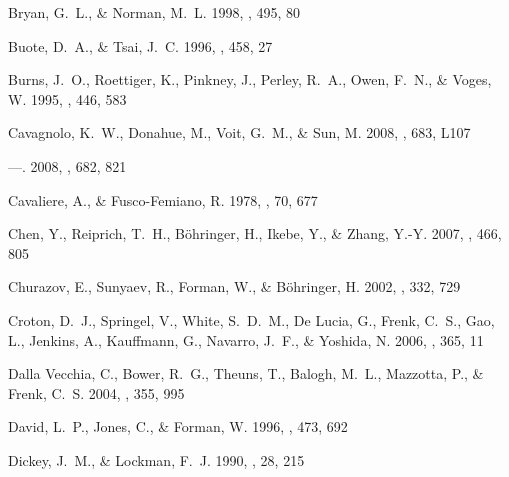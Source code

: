 \documentclass[12pt,preprint]{aastex}
\begin{document}
\begin{thebibliography}{138}
{Bryan}, G.~L., \& {Norman}, M.~L. 1998, \apj, 495, 80

{Buote}, D.~A., \& {Tsai}, J.~C. 1996, \apj, 458, 27

{Burns}, J.~O., {Roettiger}, K., {Pinkney}, J., {Perley}, R.~A., {Owen}, F.~N.,
  \& {Voges}, W. 1995, \apj, 446, 583

{Cavagnolo}, K.~W., {Donahue}, M., {Voit}, G.~M., \& {Sun}, M.
  2008{}, \apjl, 683, L107

---. 2008{}, \apj, 682, 821

{Cavaliere}, A., \& {Fusco-Femiano}, R. 1978, \aap, 70, 677

{Chen}, Y., {Reiprich}, T.~H., {B{\"o}hringer}, H., {Ikebe}, Y., \& {Zhang},
  Y.-Y. 2007, \aap, 466, 805

{Churazov}, E., {Sunyaev}, R., {Forman}, W., \& {B{\"o}hringer}, H. 2002,
  \mnras, 332, 729

{Croton}, D.~J., {Springel}, V., {White}, S.~D.~M., {De Lucia}, G., {Frenk},
  C.~S., {Gao}, L., {Jenkins}, A., {Kauffmann}, G., {Navarro}, J.~F., \&
  {Yoshida}, N. 2006, \mnras, 365, 11

{Dalla Vecchia}, C., {Bower}, R.~G., {Theuns}, T., {Balogh}, M.~L., {Mazzotta},
  P., \& {Frenk}, C.~S. 2004, \mnras, 355, 995

{David}, L.~P., {Jones}, C., \& {Forman}, W. 1996, \apj, 473, 692

{Dickey}, J.~M., \& {Lockman}, F.~J. 1990, \araa, 28, 215


\end{thebibliography}
\end{document}
